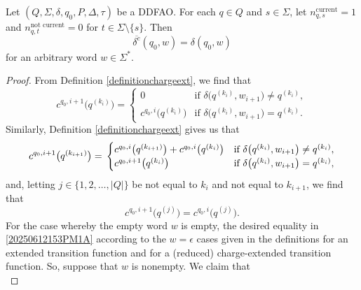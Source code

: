 \documentclass[10pt,a4paper]{amsart}
\begin{document}
\begin{theorem}\label{theoremmainformalize}
 Let $(Q, \Sigma, \delta, q_0, P, \Delta, \tau)$ be a DDFAO. For each $q \in Q$ and $s \in \Sigma$, let 
 $ n^{\text{current}}_{q, s} = 1$ and 
 $n_{q, t}^{\text{not current}} = 0$ for $t \in \Sigma \setminus \{ s \}$. Then 
\begin{equation}\label{20250612153PM1A}
 \overline{\delta^{c}}(q_0, w) = \delta(q_0, w) 
\end{equation}
 for an arbitrary word $w \in \Sigma^{\ast}$. 
\end{theorem}

\begin{proof}
 From Definition \ref{definitionchargeext}, we find that 
\begin{equation}\label{20250612202PM1A}
 c^{q_0, i+1}\big( q^{(k_{i})} \big) = 
 \begin{cases} 
 0 & \text{if $\delta\big( q^{(k_i)}, w_{i+1} \big) \neq q^{(k_i)} $}, \\ 
 c^{q_0, i}\big( q^{(k_{i})} \big) 
 & \text{if $\delta\big( q^{(k_i)}, w_{i+1} \big) = q^{(k_i)} $}. 
 \end{cases} 
\end{equation}
 Similarly, Definition \ref{definitionchargeext} gives us that 
\begin{equation}\label{fromdefinitioncases2}
 c^{q_0, i+1}\big( q^{(k_{i+1})} \big) = \\ 
 \begin{cases} 
 c^{q_0, i}\big( q^{(k_{i+1})} \big) + c^{q_0, i}\big( q^{(k_{i})} \big) 
 & \text{if $\delta\big( q^{(k_i)}, w_{i+1} \big) \neq q^{(k_i)} $}, \\ 
 c^{q_0, i+1}\big( q^{(k_i)} \big) & \text{if $\delta\big( q^{(k_i)}, w_{i+1} \big) = q^{(k_i)} $}, 
 \end{cases} 
\end{equation}
 and, letting $j \in \{ 1, 2, \ldots, |Q| \}$ be not equal to $k_i$ and not equal to $k_{i+1}$, we find that 
\begin{equation}\label{2025061241888888888878P8M8A}
 c^{q_0, i+1}\big( q^{(j)} \big) = c^{q_0, i}\big( q^{(j)} \big). 
 \end{equation}
 For the case whereby the empty word $w$ is empty, the desired equality in 
 \eqref{20250612153PM1A} according to the $w = \epsilon$
 cases given in the definitions for an extended transition function and for a (reduced)
 charge-extended transition function. 
 So, suppose that $w$ is nonempty. 
 We claim that 
\begin{equation}\label{claimcq0i}

\end{equation}
\end{proof}
\end{document}
